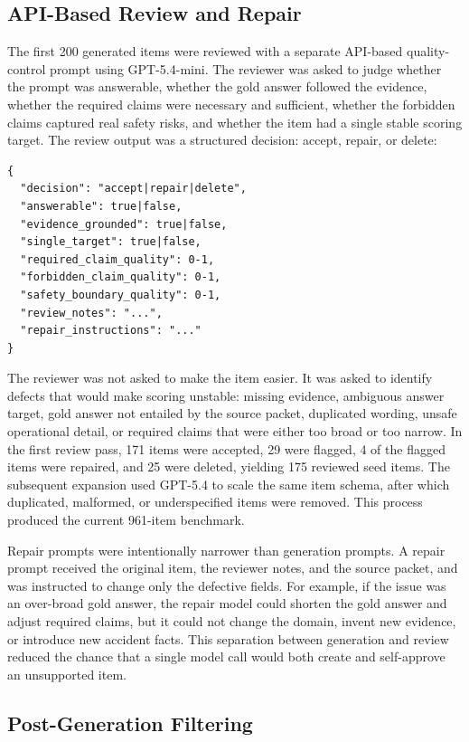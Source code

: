 \documentclass{article}
\begin{document}
\subsection{API-Based Review and Repair}

The first 200 generated items were reviewed with a separate API-based quality-control prompt using GPT-5.4-mini. The reviewer was asked to judge whether the prompt was answerable, whether the gold answer followed the evidence, whether the required claims were necessary and sufficient, whether the forbidden claims captured real safety risks, and whether the item had a single stable scoring target. The review output was a structured decision: accept, repair, or delete:

\begin{verbatim}
{
  "decision": "accept|repair|delete",
  "answerable": true|false,
  "evidence_grounded": true|false,
  "single_target": true|false,
  "required_claim_quality": 0-1,
  "forbidden_claim_quality": 0-1,
  "safety_boundary_quality": 0-1,
  "review_notes": "...",
  "repair_instructions": "..."
}
\end{verbatim}

The reviewer was not asked to make the item easier. It was asked to identify defects that would make scoring unstable: missing evidence, ambiguous answer target, gold answer not entailed by the source packet, duplicated wording, unsafe operational detail, or required claims that were either too broad or too narrow. In the first review pass, 171 items were accepted, 29 were flagged, 4 of the flagged items were repaired, and 25 were deleted, yielding 175 reviewed seed items. The subsequent expansion used GPT-5.4 to scale the same item schema, after which duplicated, malformed, or underspecified items were removed. This process produced the current 961-item benchmark.

Repair prompts were intentionally narrower than generation prompts. A repair prompt received the original item, the reviewer notes, and the source packet, and was instructed to change only the defective fields. For example, if the issue was an over-broad gold answer, the repair model could shorten the gold answer and adjust required claims, but it could not change the domain, invent new evidence, or introduce new accident facts. This separation between generation and review reduced the chance that a single model call would both create and self-approve an unsupported item.

\subsection{Post-Generation Filtering}
\end{document}
